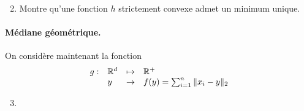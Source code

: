 \begin{enumerate}
  \setcounter{enumi}{1}  
  \item Montre qu'une fonction $h$ strictement convexe admet un minimum unique.
  \todo{}
  \solution{
    \todo{}
  }
\end{enumerate}


\paragraph{Médiane géométrique.}
On considère maintenant la fonction
$$
\begin{array}{rlcl}
  g: & \mathbb{R}^d & \mapsto & \mathbb{R}^+ \\
  & y & \to & f(y) = \sum_{i=1}^n \|x_i - y\|_2
  \end{array}
$$

\begin{enumerate}
  \setcounter{enumi}{2}  
  \item 
\end{enumerate}
